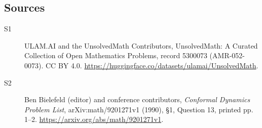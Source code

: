 \documentclass[11pt]{article}
\begin{document}
\subsection{Sources}
\begin{description}
\item[\hypertarget{source:5300073:1}{S1}] ULAM.AI and the UnsolvedMath Contributors, UnsolvedMath: A Curated Collection of Open Mathematics Problems, record 5300073 (AMR-052-0073). CC BY 4.0. \url{https://huggingface.co/datasets/ulamai/UnsolvedMath}.
\item[\hypertarget{source:5300073:2}{S2}] Ben Bielefeld (editor) and conference contributors, \emph{Conformal Dynamics Problem List}, arXiv:math/9201271v1 (1990), \S1, Question 13, printed pp. 1--2. \url{https://arxiv.org/abs/math/9201271v1}.
\end{description}
\label{end:5300073}
\end{document}
